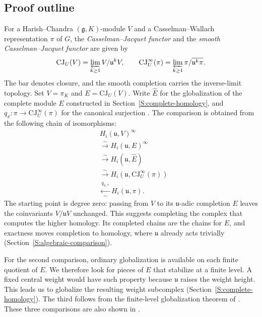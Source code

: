 \documentclass[a4paper,12pt]{amsart}
\numberwithin{equation}{section}
\theoremstyle{plain}
\theoremstyle{definition}
\theoremstyle{remark}
\begin{document}
\subsection*{Proof outline}
For a Harish--Chandra $(\mathfrak g,K)$-module $V$ and a Casselman--Wallach representation $\pi$ of $G$, the \emph{Casselman--Jacquet functor} and the \emph{smooth Casselman--Jacquet functor} are given by
\[
 \mathrm{CJ}_U(V)=\varprojlim_{k\geq1}V/\mathfrak u^kV,
 \qquad
 \mathrm{CJ}^{\infty}_U(\pi)
   =\varprojlim_{k\geq1}\pi/\overline{\mathfrak u^k\pi}.
\]
The bar denotes closure, and the smooth completion carries the inverse-limit topology.
Set $V=\pi_K$ and $E=\mathrm{CJ}_U(V)$.
Write $\widehat E$ for the globalization of the complete module $E$ constructed in Section~\ref{S:complete-homology}, and $q_\pi:\pi\to\mathrm{CJ}^{\infty}_U(\pi)$ for the canonical surjection \cite[Proposition~6.1]{CWYZ}.
The comparison is obtained from the following chain of isomorphisms:
\begin{equation}\label{Eq:intro-chain}
\begin{aligned}
 &H_i(\mathfrak u,V)^\infty\\
 &\xrightarrow{\sim} H_i(\mathfrak u,E)^\infty\\
 &\xrightarrow{\sim} H_i(\mathfrak u,\widehat E)\\
 &\xrightarrow{\sim} H_i(\mathfrak u,\mathrm{CJ}^{\infty}_U(\pi))\\
 &\xleftarrow[\sim]{q_{\pi,*}}
 H_i(\mathfrak u,\pi).
\end{aligned}
\end{equation}
The starting point is degree zero: passing from $V$ to its $\mathfrak u$-adic completion $E$ leaves the coinvariants $V/\mathfrak u V$ unchanged.
This suggests completing the complex that computes the higher homology.
Its completed chains are the chains for $E$, and exactness moves completion to homology, where $\mathfrak u$ already acts trivially (Section~\ref{S:algebraic-comparison}).

For the second comparison, ordinary globalization is available on each finite quotient of $E$.
We therefore look for pieces of $E$ that stabilize at a finite level.
A fixed central weight would have such property because $\mathfrak u$ raises the weight height.
This leads us to globalize the resulting weight subcomplex (Section~\ref{S:complete-homology}).
The third follows from the finite-level globalization theorem of \cite{CWYZ}.
These three comparisons are also shown in \cite{Wu-Yu}. 
\end{document}
